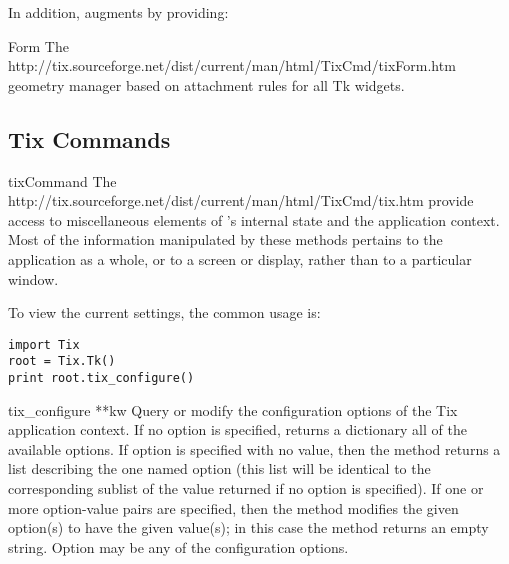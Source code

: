In addition,  augments  by providing:

\begin{classdesc}{Form}{}
The 
{http://tix.sourceforge.net/dist/current/man/html/TixCmd/tixForm.htm}
geometry manager based on attachment rules for all Tk widgets.
\end{classdesc}


%

\subsection{Tix Commands}

\begin{classdesc}{tixCommand}{}
The 
{http://tix.sourceforge.net/dist/current/man/html/TixCmd/tix.htm}
provide access to miscellaneous elements of 's internal
state and the   application context.  Most of the information
manipulated by these methods pertains to the application as a whole,
or to a screen or display, rather than to a particular window.

To view the current settings, the common usage is:
\begin{verbatim}
import Tix
root = Tix.Tk()
print root.tix_configure()
\end{verbatim}
\end{classdesc}

\begin{methoddesc}{tix_configure}{ **kw}
Query or modify the configuration options of the Tix application
context. If no option is specified, returns a dictionary all of the
available options.  If option is specified with no value, then the
method returns a list describing the one named option (this list will
be identical to the corresponding sublist of the value returned if no
option is specified).  If one or more option-value pairs are
specified, then the method modifies the given option(s) to have the
given value(s); in this case the method returns an empty string.
Option may be any of the configuration options.
\end{methoddesc}

